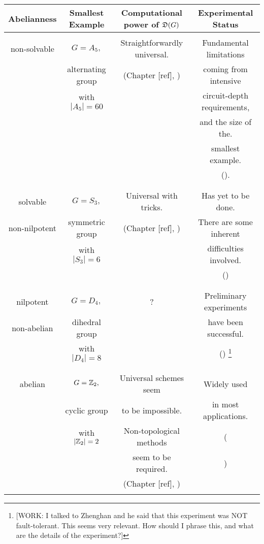 \begin{center}
\begin{tabular}{|| c | c | c | c ||} 

\hline
Abelianness & Smallest Example& Computational power of $\mathfrak{D}(G)$& Experimental Status \\ [0.5ex] 
 \hline\hline
  &  & &\\ 
 non-solvable & $G=A_5,$ & Straightforwardly universal.& Fundamental limitations\\
  & alternating group & (Chapter [ref], \cite{mochon2003anyons})& coming from intensive\\ 
  & with $|A_5|=60$ & & circuit-depth requirements,\\ 
  &  & & and the size of the.\\ 
  &  & & smallest example.\\ 
  &  & & (\cite{bravyi2022adaptive}).\\ 
  &  & &\\ 
 \hline
  &  & &\\ 
 solvable& $G=S_3,$ & Universal with tricks. & Has yet to be done.\\
 non-nilpotent& symmetric group& (Chapter [ref], \cite{mochon2004anyon}) & There are some inherent \\ 
 & with $|S_3|=6$ & & difficulties involved.\\ 
  &  & & (\cite{tantivasadakarn2023hierarchy})\\ 
  &  & &\\ 
 \hline  &  & &\\ 
 nilpotent& $G=D_4,$ & ? & Preliminary experiments \\
 non-abelian& dihedral group & & have been successful.  \\ 
 & with $|D_4|=8$ & & (\cite{iqbal2024non}) \footnote{[WORK: I talked to Zhenghan and he said that this experiment was NOT fault-tolerant. This seems very relevant. How should I phrase this, and what are the details of the experiment?]}   \\ 
  &  & &\\ 
 \hline
  &  & &\\ 
 abelian & $G=\mathbb{Z}_2,$ & Universal schemes seem& Widely used\\ 
  & cyclic group & to be impossible.& in most applications. \\ 
  &with $|\mathbb{Z}_2|=2$ &  Non-topological methods& (\cite{bravyi2024high, hong2024entangling}\\ 
  &  & seem to be required.& \cite{balewski2024engineering, google2023suppressing})\\ 
  &  & (Chapter [ref], \cite{bravyi2013classification, eastin2009restrictions}) &\\ 
  &  & &\\ 
 \hline
\end{tabular}
\end{center}


